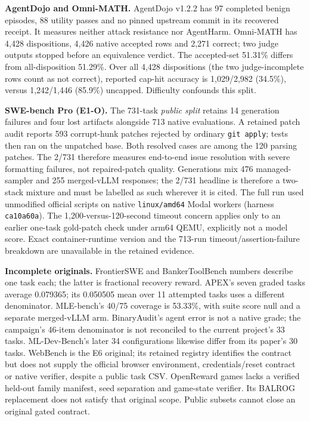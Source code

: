 \documentclass[a4paper,runningheads]{llncs}
\begin{document}
\textbf{AgentDojo and Omni-MATH.} AgentDojo v1.2.2 has 97 completed benign
episodes, 88 utility passes and no pinned upstream commit in its recovered
receipt. It measures neither attack resistance nor AgentHarm. Omni-MATH has
4,428 dispositions, 4,426 native accepted rows and 2,271 correct; two judge
outputs stopped before an equivalence verdict. The accepted-set 51.31\% differs
from all-disposition 51.29\%. Over all 4,428 dispositions (the two
judge-incomplete rows count as not correct), reported cap-hit accuracy is
1,029/2,982 (34.5\%), versus 1,242/1,446 (85.9\%) uncapped. Difficulty confounds this split.

\textbf{SWE-bench Pro (E1-O).} The 731-task \emph{public split} retains 14
generation failures and four lost artifacts alongside 713 native evaluations.
A retained patch audit reports 593 corrupt-hunk patches rejected by ordinary
\texttt{git apply}; tests then ran on the unpatched base. Both resolved cases
are among the 120 parsing patches. The 2/731 therefore measures end-to-end
issue resolution with severe formatting failures, not repaired-patch quality.
Generations mix 476 managed-sampler and 255 merged-vLLM responses; the
2/731 headline is therefore a two-stack mixture and must be labelled as
such wherever it is cited.
The full run used unmodified official scripts on native \texttt{linux/amd64}
Modal workers (harness \texttt{ca10a60a}). The 1,200-versus-120-second timeout
concern applies only to an earlier one-task gold-patch check under arm64 QEMU,
explicitly not a model score. Exact container-runtime version and the 713-run
timeout/assertion-failure breakdown are unavailable in the retained evidence.

\textbf{Incomplete originals.} FrontierSWE and BankerToolBench numbers describe
one task each; the latter is fractional recovery reward. APEX's seven graded
tasks average 0.079365; its 0.050505 mean over 11 attempted tasks uses a different
denominator. MLE-bench's 40/75 coverage is 53.33\%, with suite score null and a
separate merged-vLLM arm. BinaryAudit's agent error is not a native grade; the campaign's 46-item
denominator is not reconciled to the current project's 33 tasks. ML-Dev-Bench's
later 34 configurations likewise differ from its paper's 30 tasks.
WebBench is the E6 original; its retained registry identifies the contract but
does not supply the official browser environment, credentials/reset contract
or native verifier, despite a public task CSV. OpenReward games lacks a verified
held-out family manifest, seed separation and game-state verifier. Its BALROG
replacement does not satisfy that original scope. Public subsets cannot close an original gated contract.
\end{document}
